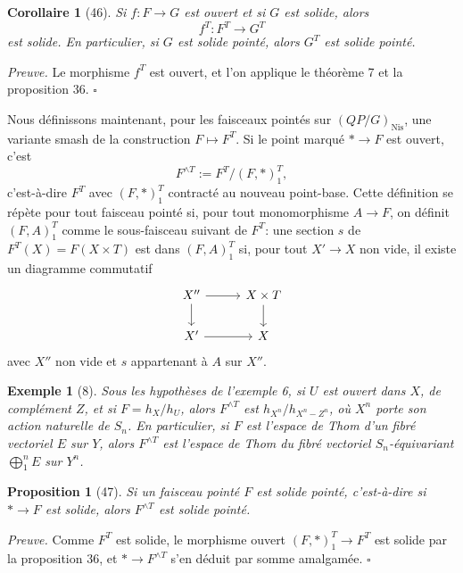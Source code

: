 \documentclass[11pt]{article}
\newcommand{\Nis}{\mathrm{Nis}}
\newcommand{\pt}{*}
\theoremstyle{deligne}
\newtheorem*{proposition*}{Proposition}
\newtheorem*{corollary*}{Corollaire}
\newtheorem*{example*}{Exemple}
\newenvironment{proofdel}{\noindent\textit{Preuve.}}{\hfill$\square$}
\begin{document}
\begin{corollary*}[46]
Si \(f:F\to G\) est ouvert et si \(G\) est solide, alors
\[
f^T:F^T\longrightarrow G^T
\]
est solide. En particulier, si \(G\) est solide pointé, alors \(G^T\) est solide pointé.
\end{corollary*}

\begin{proofdel}
Le morphisme \(f^T\) est ouvert, et l'on applique le théorème 7 et la proposition 36.
\end{proofdel}

Nous définissons maintenant, pour les faisceaux pointés sur \((QP/G)_{\Nis}\), une variante smash de la construction \(F\mapsto F^T\). Si le point marqué \(\pt\to F\) est ouvert, c'est
\[
F^{\wedge T}:=F^T/(F,\pt)^T_1,
\]
c'est-à-dire \(F^T\) avec \((F,\pt)^T_1\) contracté au nouveau point-base. Cette définition se répète pour tout faisceau pointé si, pour tout monomorphisme \(A\to F\), on définit \((F,A)^T_1\) comme le sous-faisceau suivant de \(F^T\): une section \(s\) de \(F^T(X)=F(X\times T)\) est dans \((F,A)^T_1\) si, pour tout \(X'\to X\) non vide, il existe un diagramme commutatif
\[
\begin{tikzcd}[column sep=2.8em,row sep=1.7em]
X'' \arrow[r] \arrow[d] & X\times T \arrow[d]\\
X' \arrow[r] & X
\end{tikzcd}
\]
avec \(X''\) non vide et \(s\) appartenant à \(A\) sur \(X''\).

\begin{example*}[8]
Sous les hypothèses de l'exemple 6, si \(U\) est ouvert dans \(X\), de complément \(Z\), et si \(F=h_X/h_U\), alors \(F^{\wedge T}\) est \(h_{X^n}/h_{X^n-Z^n}\), où \(X^n\) porte son action naturelle de \(S_n\). En particulier, si \(F\) est l'espace de Thom d'un fibré vectoriel \(E\) sur \(Y\), alors \(F^{\wedge T}\) est l'espace de Thom du fibré vectoriel \(S_n\)-équivariant \(\bigoplus_1^n E\) sur \(Y^n\).
\end{example*}

\begin{proposition*}[47]
Si un faisceau pointé \(F\) est solide pointé, c'est-à-dire si \(\pt\to F\) est solide, alors \(F^{\wedge T}\) est solide pointé.
\end{proposition*}

\begin{proofdel}
Comme \(F^T\) est solide, le morphisme ouvert \((F,\pt)^T_1\to F^T\) est solide par la proposition 36, et \(\pt\to F^{\wedge T}\) s'en déduit par somme amalgamée.
\end{proofdel}
\end{document}
